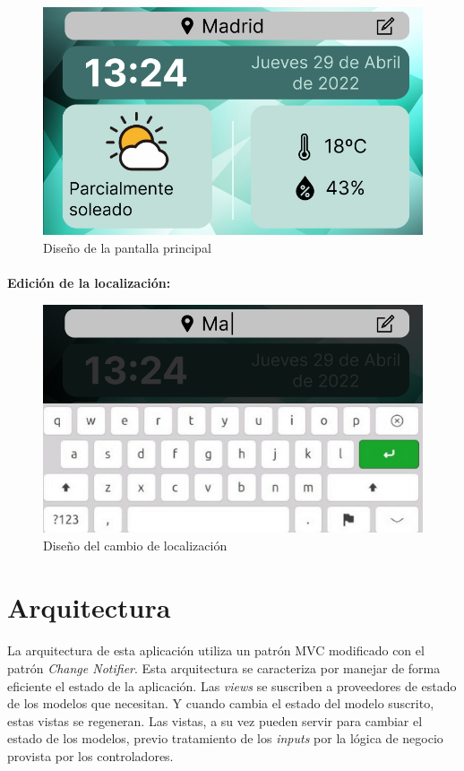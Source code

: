 \begin{figure}[H]
	\centering
	\includegraphics[width=0.75\linewidth]{imgs/figma-main}
	\caption[Diseño de la pantalla principal]{Diseño de la pantalla principal}
	\label{fig:design_main_screen}
\end{figure}

\paragraph{}\textbf{Edición de la localización:}

\begin{figure}[H]
	\centering
	\includegraphics[width=0.75\linewidth]{imgs/figma-location}
	\caption[Diseño del cambio de localización]{Diseño del cambio de localización}
	\label{fig:design_location}
\end{figure}

\section{Arquitectura}

\paragraph{}La arquitectura de esta aplicación utiliza un patrón MVC modificado con el
patrón \emph{Change Notifier}. Esta arquitectura se caracteriza por manejar de forma
eficiente el estado de la aplicación. Las \emph{views} se suscriben a proveedores de
estado de los modelos que necesitan. Y cuando cambia el estado del modelo suscrito,
estas vistas se regeneran. Las vistas, a su vez pueden servir para cambiar el estado
de los modelos, previo tratamiento de los \emph{inputs} por la lógica de negocio provista
por los controladores.

